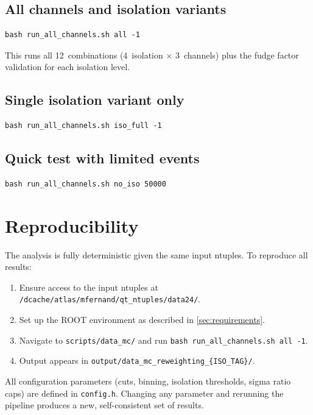 \documentclass[12pt,a4paper]{article}
\begin{document}
\subsection{All channels and isolation variants}

\begin{lstlisting}
bash run_all_channels.sh all -1
\end{lstlisting}

This runs all 12~combinations (4~isolation $\times$ 3~channels) plus the
fudge factor validation for each isolation level.

\subsection{Single isolation variant only}

\begin{lstlisting}
bash run_all_channels.sh iso_full -1
\end{lstlisting}

\subsection{Quick test with limited events}

\begin{lstlisting}
bash run_all_channels.sh no_iso 50000
\end{lstlisting}

\section{Reproducibility}
\label{sec:reproducibility}

The analysis is fully deterministic given the same input ntuples. To
reproduce all results:

\begin{enumerate}
  \item Ensure access to the input ntuples at
    \texttt{/dcache/atlas/mfernand/qt\_ntuples/data24/}.
  \item Set up the ROOT environment as described in \cref{sec:requirements}.
  \item Navigate to \texttt{scripts/data\_mc/} and run
    \texttt{bash run\_all\_channels.sh all -1}.
  \item Output appears in \texttt{output/data\_mc\_reweighting\_\{ISO\_TAG\}/}.
\end{enumerate}

All configuration parameters (cuts, binning, isolation thresholds, sigma
ratio caps) are defined in \texttt{config.h}. Changing any parameter and
rerunning the pipeline produces a new, self-consistent set of results.
\end{document}
